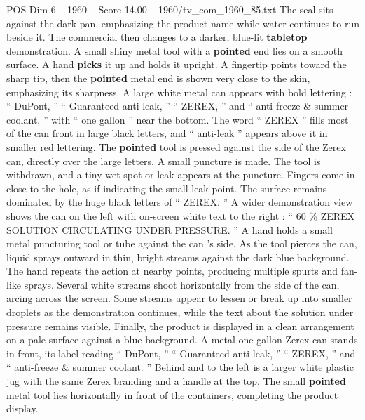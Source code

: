 \begin{textsample}{POS Dim 6 – 1960 – Score 14.00 – 1960/tv\_com\_1960\_85.txt}
The seal sits against the dark pan, emphasizing the product name while water continues to run beside it.
The commercial then changes to a darker, blue-lit \textbf{tabletop} demonstration.
A small shiny metal tool with a \textbf{pointed} end lies on a smooth surface.
A hand \textbf{picks} it up and holds it upright.
A fingertip points toward the sharp tip, then the \textbf{pointed} metal end is shown very close to the skin, emphasizing its sharpness.
A large white metal can appears with bold lettering : “ DuPont, ” “ Guaranteed anti-leak, ” “ ZEREX, ” and “ anti-freeze \& summer coolant, ” with “ one gallon ” near the bottom.
The word “ ZEREX ” fills most of the can front in large black letters, and “ anti-leak ” appears above it in smaller red lettering.
The \textbf{pointed} tool is pressed against the side of the Zerex can, directly over the large letters.
A small puncture is made.
The tool is withdrawn, and a tiny wet spot or leak appears at the puncture.
Fingers come in close to the hole, as if indicating the small leak point.
The surface remains dominated by the huge black letters of “ ZEREX. ” A wider demonstration view shows the can on the left with on-screen white text to the right : “ 60 \% ZEREX SOLUTION CIRCULATING UNDER PRESSURE. ” A hand holds a small metal puncturing tool or tube against the can ’s side.
As the tool pierces the can, liquid sprays outward in thin, bright streams against the dark blue background.
The hand repeats the action at nearby points, producing multiple spurts and fan-like sprays.
Several white streams shoot horizontally from the side of the can, arcing across the screen.
Some streams appear to lessen or break up into smaller droplets as the demonstration continues, while the text about the solution under pressure remains visible.
Finally, the product is displayed in a clean arrangement on a pale surface against a blue background.
A metal one-gallon Zerex can stands in front, its label reading “ DuPont, ” “ Guaranteed anti-leak, ” “ ZEREX, ” and “ anti-freeze \& summer coolant. ” Behind and to the left is a larger white plastic jug with the same Zerex branding and a handle at the top.
The small \textbf{pointed} metal tool lies horizontally in front of the containers, completing the product display.

\end{textsample}
